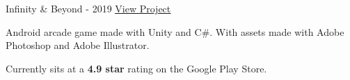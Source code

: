 \begin{cventries}
  \cventry
    {} %
    {Infinity \& Beyond - 2019} %
    {\href{https://play.google.com/store/apps/details?id=com.KKSGames.InifintyandBeyond}{\underline{View Project}}} %
    {} %
    {
      \begin{cvitems} %
        \item {Android arcade game made with Unity and C\#. With assets made with Adobe Photoshop and Adobe Illustrator.}
        \item {Currently sits at a \textbf{4.9 star} rating on the Google Play Store.}
      \end{cvitems}
    }


\end{cventries}
